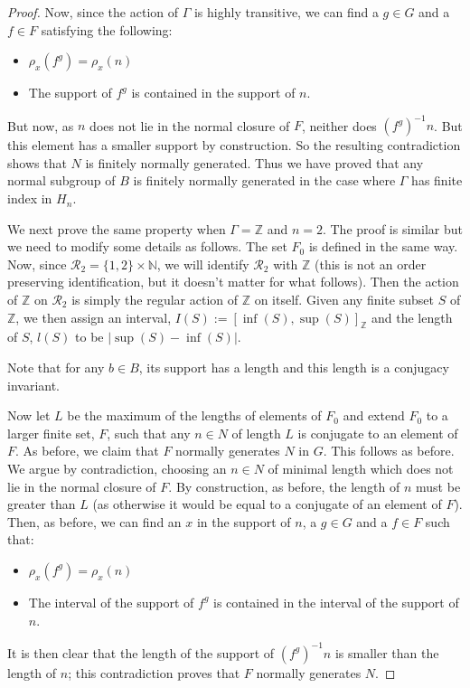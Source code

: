 \documentclass[10pt,a4paper]{amsart}
\newcommand{\N}{\mathbb N}
\newcommand{\Ra}{\mathcal{R}}
\newcommand{\Z}{\mathbb Z}
\begin{document}
\begin{proof}
Now, since the action of $\Gamma$ is highly transitive, we can find a $g \in G$ and a $f \in F$ satisfying the following: 
\begin{itemize}
	\item $\rho_x(f^g) = \rho_x(n)$
	\item The support of $f^g$ is contained in the support of $n$. 
\end{itemize}
But now, as $n$ does not lie in the normal closure of $F$, neither does ${(f^g)}^{-1} n$. But this element has a smaller support by construction. So the resulting contradiction shows that $N$ is finitely normally generated. Thus we have proved that any normal subgroup of $B$ is finitely normally generated in the case where $\Gamma$ has finite index in $H_n$. 

\medspace

We next prove the same property when $\Gamma=\Z$ and $n=2$. The proof is similar but we need to modify some details as follows. The set $F_0$ is defined in the same way. Now, since $\Ra_2 = \{ 1,2\} \times \N$, we will identify $\Ra_2$ with $\Z$ (this is not an order preserving identification, but it doesn't matter for what follows). Then the action of $\Z$ on $\Ra_2$ is simply the regular action of $\Z$ on itself. Given any finite subset $S$ of $\Z$, we then assign an interval, $I(S):=[\inf(S),\sup(S)]_{\Z}$ and the length of $S$, $l(S)$ to be $|\sup(S) - \inf(S)|$. 

Note that for any $b \in B$, its support has a length and this length is a conjugacy invariant. 

Now let $L$ be the maximum of the lengths of elements of $F_0$ and extend $F_0$ to a larger finite set, $F$, such that any $n \in N$ of length $L$ is conjugate to an element of $F$. As before, we claim that $F$ normally generates $N$ in $G$. This follows as before. We argue by contradiction, choosing an $n \in N$ of minimal length which does not lie in the normal closure of $F$. By construction, as before, the length of $n$ must be greater than $L$ (as otherwise it would be equal to a conjugate of an element of $F$). Then, as before, we can find an $x$ in the support of $n$, a $g \in G$ and a $f \in F$ such that: 
\begin{itemize}
	\item $\rho_x(f^g) = \rho_x(n)$
	\item The interval of the support of $f^g$ is contained in the interval of the support of $n$. 
\end{itemize}
It is then clear that the length of the support of ${(f^g)}^{-1} n$ is smaller than the length of $n$; this contradiction proves that $F$ normally generates $N$.


\end{proof}
\end{document}
